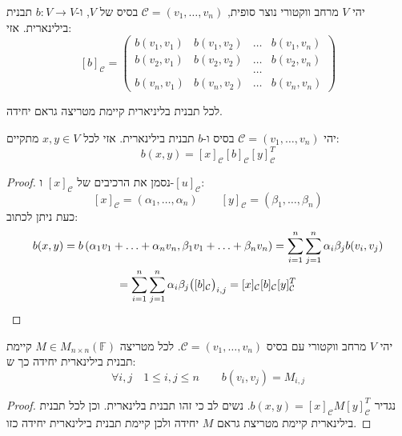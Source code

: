 \documentclass{tstextbook}
\begin{document}
\begin{definition}
יהי \(V\) מרחב ווקטורי נוצר סופית, \(\mathcal{C}=\left( v_{1},\dots,v_{n} \right)\) בסיס של \(V\), ו-\(b:V\to V\) תבנית בילינארית. אזי:
$$[b]_{\mathcal{C} }=\begin{pmatrix}b(v_{1},v_{1})&b(v_{1},v_{2})&\dots&b(v_{1},v_{n})\\ b(v_{2},v_{1})&b(v_{2},v_{2})&\dots&b(v_{2},v_{n})\\ &&\dots\\ b(v_{n},v_{1})&b(v_{n},v_{2})&\dots&b(v_{n},v_{n})\end{pmatrix}$$

\end{definition}
\begin{corollary}
לכל תבנית בליניארית קיימת מטריצה גראם יחידה.

\end{corollary}
\begin{proposition}
יהי \(\mathcal{C}=\left( v_{1},\dots,v_{n} \right)\)  בסיס ו-\(b\) תבנית בילינארית. אזי לכל \(x,y \in V\) מתקיים:
$$b(x,y)=[x]_{\mathcal{C}}[b]_{\mathcal{C}}[y]_{\mathcal{C}}^{T}$$

\end{proposition}
\begin{proof}
נסמן את הרכיבים של \([x]_{\mathcal{C}}\) ו-\([u]_{\mathcal{C}}\):
$$[x]_{\mathcal{C}}=\left( \alpha_{1},\ldots,\alpha_{n} \right)\qquad [y]_{\mathcal{C}}=\left( \beta_{1},\ldots,\beta_{n} \right)$$
כעת ניתן לכתוב:
\begin{gather*}b(x,y)=b\left( \alpha_{1}v_{1}+\ldots+\alpha_{n}v_{n},\beta_{1}v_{1}+\ldots+\beta_{n}v_{n} \right)=\sum_{i=1}^{n}\sum_{j=1}^{n}\alpha_{i}\beta_{j}b(v_{i},v_{j})  \\=\sum_{i=1}^{n}\sum_{j=1}^{n}\alpha_{i}\beta_{j}\big{(}[b]_{\mathcal{C}}\big{)}_{i,j}=[x]_{\mathcal{C}}[b]_{\mathcal{C}}[y]_{\mathcal{C}}^{T}
\end{gather*}

\end{proof}
\begin{corollary}
יהי \(V\) מרחב ווקטורי עם בסיס \(\mathcal{C}=\left( v_{1},\dots,v_{n} \right)\). לכל מטריצה \(M \in M_{n\times n}\left( \mathbb{F}  \right)\) קיימת תבנית בילינארית יחידה כך ש:
$$\forall i,j\quad  1\leq i,j\leq n\qquad b(v_{i},v_{j})=M_{i,j}$$

\end{corollary}
\begin{proof}
נגדיר \(b(x,y)=[x]_{\mathcal{C}}M[y]_{\mathcal{C}}^{T}\). נשים לב כי זהו תבנית בלינארית. וכן לכל תבנית בילינארית קיימת מטריצת גראם \(M\) יחידה ולכן קיימת תבנית בילינארית יחידה כזו.

\end{proof}
\end{document}
